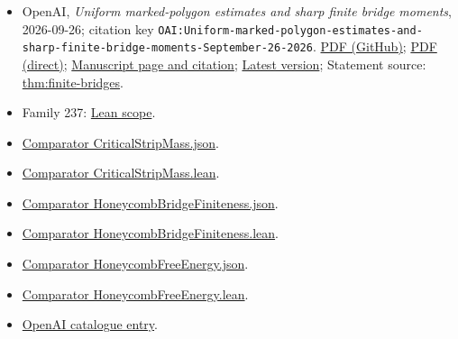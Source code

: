 \documentclass[11pt]{article}
\begin{document}
\begin{itemize}
\item OpenAI, \emph{Uniform marked-polygon estimates and sharp finite bridge moments}, 2026-09-26; citation key \texttt{OAI:Uniform-marked-polygon-estimates-and-sharp-finite-bridge-moments-September-26-2026}. \href{https://github.com/openai/math/blob/adc7f1241b42e322a6451854ab7e4b4c146bf78a/preprints/Uniform-marked-polygon-estimates-and-sharp-finite-bridge-moments-September-26-2026/main.pdf}{PDF (GitHub)}; \href{https://github.com/openai/math/raw/adc7f1241b42e322a6451854ab7e4b4c146bf78a/preprints/Uniform-marked-polygon-estimates-and-sharp-finite-bridge-moments-September-26-2026/main.pdf}{PDF (direct)}; \href{https://github.com/openai/math/blob/adc7f1241b42e322a6451854ab7e4b4c146bf78a/preprints/Uniform-marked-polygon-estimates-and-sharp-finite-bridge-moments-September-26-2026/README.md}{Manuscript page and citation}; \href{https://github.com/openai/math/blob/main/preprints/Uniform-marked-polygon-estimates-and-sharp-finite-bridge-moments-September-26-2026/main.pdf}{Latest version}; Statement source: \href{https://github.com/openai/math/blob/adc7f1241b42e322a6451854ab7e4b4c146bf78a/preprints/Uniform-marked-polygon-estimates-and-sharp-finite-bridge-moments-September-26-2026/build/sections/introduction.tex\#L19}{thm:finite-bridges}.
\item Family 237: \href{https://github.com/openai/math/blob/adc7f1241b42e322a6451854ab7e4b4c146bf78a/lean/docs/237.md}{Lean scope}.
\item \href{https://github.com/openai/math/blob/adc7f1241b42e322a6451854ab7e4b4c146bf78a/lean/ComparatorChallenges/CriticalStripMass.json}{Comparator CriticalStripMass.json}.
\item \href{https://github.com/openai/math/blob/adc7f1241b42e322a6451854ab7e4b4c146bf78a/lean/ComparatorChallenges/CriticalStripMass.lean}{Comparator CriticalStripMass.lean}.
\item \href{https://github.com/openai/math/blob/adc7f1241b42e322a6451854ab7e4b4c146bf78a/lean/ComparatorChallenges/HoneycombBridgeFiniteness.json}{Comparator HoneycombBridgeFiniteness.json}.
\item \href{https://github.com/openai/math/blob/adc7f1241b42e322a6451854ab7e4b4c146bf78a/lean/ComparatorChallenges/HoneycombBridgeFiniteness.lean}{Comparator HoneycombBridgeFiniteness.lean}.
\item \href{https://github.com/openai/math/blob/adc7f1241b42e322a6451854ab7e4b4c146bf78a/lean/ComparatorChallenges/HoneycombFreeEnergy.json}{Comparator HoneycombFreeEnergy.json}.
\item \href{https://github.com/openai/math/blob/adc7f1241b42e322a6451854ab7e4b4c146bf78a/lean/ComparatorChallenges/HoneycombFreeEnergy.lean}{Comparator HoneycombFreeEnergy.lean}.
\item \href{https://github.com/openai/math/blob/adc7f1241b42e322a6451854ab7e4b4c146bf78a/CONTENTS.md}{OpenAI catalogue entry}.
\end{itemize}
\end{document}
